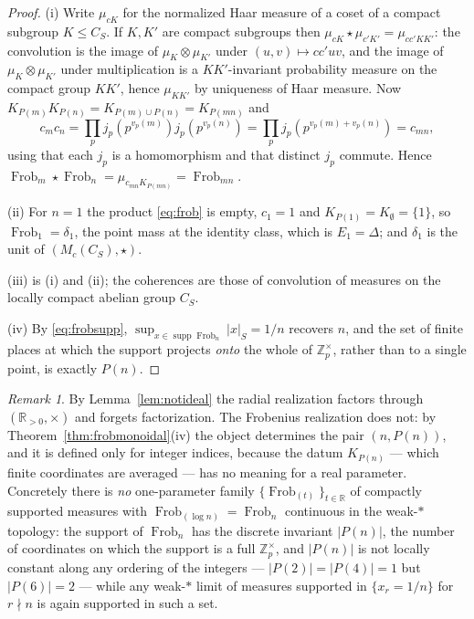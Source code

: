 \documentclass[11pt]{amsart}
\theoremstyle{definition}
\theoremstyle{remark}
\newtheorem{remark}[theorem]{Remark}
\newcommand{\R}{\mathbb R}
\newcommand{\Z}{\mathbb Z}
\newcommand{\Frob}{\operatorname{Frob}}
\newcommand{\supp}{\operatorname{supp}}
\begin{document}
\begin{proof}
(i) Write $\mu_{cK}$ for the normalized Haar measure of a coset of a compact
subgroup $K\le C_S$. If $K,K'$ are compact subgroups then
$\mu_{cK}\star\mu_{c'K'}=\mu_{cc'KK'}$: the convolution is the image of
$\mu_K\otimes\mu_{K'}$ under $(u,v)\mapsto cc'uv$, and the image of
$\mu_K\otimes\mu_{K'}$ under multiplication is a $KK'$-invariant probability
measure on the compact group $KK'$, hence $\mu_{KK'}$ by uniqueness of Haar
measure. Now $K_{P(m)}K_{P(n)}=K_{P(m)\cup P(n)}=K_{P(mn)}$ and
\[
  c_mc_n=\prod_p j_p(p^{v_p(m)})j_p(p^{v_p(n)})
   =\prod_p j_p(p^{v_p(m)+v_p(n)})=c_{mn},
\]
using that each $j_p$ is a homomorphism and that distinct $j_p$ commute. Hence
$\Frob_m\star\Frob_n=\mu_{c_{mn}K_{P(mn)}}=\Frob_{mn}$.

(ii) For $n=1$ the product \eqref{eq:frob} is empty, $c_1=1$ and
$K_{P(1)}=K_\emptyset=\{1\}$, so $\Frob_1=\delta_1$, the point mass at the
identity class, which is $E_1=\Delta$; and $\delta_1$ is the unit of
$(M_c(C_S),\star)$.

(iii) is (i) and (ii); the coherences are those of convolution of measures on
the locally compact abelian group $C_S$.

(iv) By \eqref{eq:frobsupp}, $\sup_{x\in\supp\Frob_n}|x|_S=1/n$ recovers $n$,
and the set of finite places at which the support projects \emph{onto} the
whole of $\Z_p^\times$, rather than to a single point, is exactly $P(n)$.
\end{proof}

\begin{remark}\label{rem:nointerp}
By Lemma~\ref{lem:notideal} the radial realization factors through
$(\R_{>0},\times)$ and forgets factorization. The Frobenius realization does
not: by Theorem~\ref{thm:frobmonoidal}(iv) the object determines the pair
$(n,P(n))$, and it is defined only for integer indices, because the datum
$K_{P(n)}$ --- which finite coordinates are averaged --- has no meaning for a
real parameter. Concretely there is \emph{no} one-parameter family
$\{\Frob_{(t)}\}_{t\in\R}$ of compactly supported measures with
$\Frob_{(\log n)}=\Frob_n$ continuous in the weak-$*$ topology: the support of
$\Frob_n$ has the discrete invariant $|P(n)|$, the number of coordinates on
which the support is a full $\Z_p^\times$, and $|P(n)|$ is not locally constant
along any ordering of the integers --- $|P(2)|=|P(4)|=1$ but $|P(6)|=2$ ---
while any weak-$*$ limit of measures supported in $\{x_r=1/n\}$ for $r\nmid n$
is again supported in such a set.
\end{remark}
\end{document}
